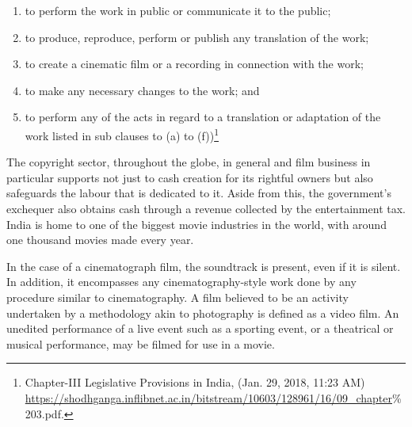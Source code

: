 \begin{multicols}{2}
\begin{enumerate}[label=$\bullet$]
\item to perform the work in public or communicate it to the public;

\item to produce, reproduce, perform or publish any translation of the work;

\item to create a cinematic film or a recording in connection with the work;

\item to make any necessary changes to the work; and

\item to perform any of the acts in regard to a translation or adaptation of the work
listed in sub clauses to (a) to (f))\footnote{Chapter-III Legislative Provisions in India, (Jan. 29, 2018, 11:23 AM)\\
 \url{https://shodhganga.inflibnet.ac.in/bitstream/10603/128961/16/09_chapter}\%203.pdf.}
\end{enumerate}

\vspace{-.4cm}


\vspace{-.1cm}

\noi
The copyright sector, throughout the globe, in general and film business in particular supports
not just to cash creation for its rightful owners but also safeguards the labour that is dedicated
to it. Aside from this, the government's exchequer also obtains cash through a revenue
collected by the entertainment tax. India is home to one of the biggest movie industries in the
world, with around one thousand movies made every year.

\vspace{-.1cm}


\vspace{-.1cm}

\noi
In the case of a cinematograph film, the soundtrack is present, even if it is silent. In addition,
it encompasses any cinematography-style work done by any procedure similar to
cinematography. A film believed to be an activity undertaken by a methodology akin to photography is defined as a video film. An unedited performance of a live event such as a
sporting event, or a theatrical or musical performance, may be filmed for use in a movie.

\vspace{-.1cm}


\end{multicols}
